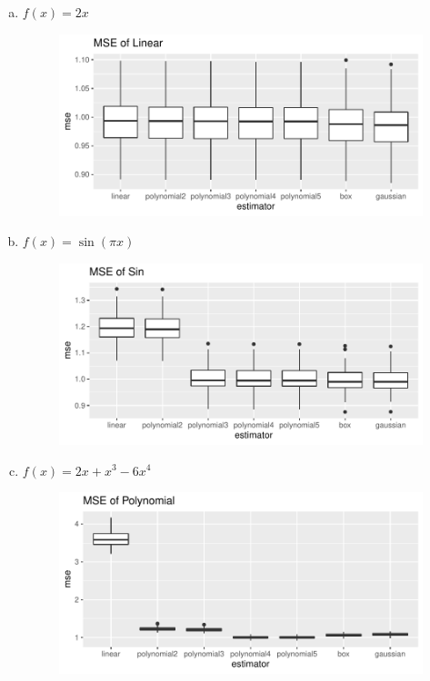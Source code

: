 \documentclass[letterpaper]{article}
\begin{document}
\begin{enumerate}[(a)]
\item $f(x) = 2x$
  \begin{figure}[h]
    \centering
    \includegraphics{mse_linear.pdf}
  \end{figure}
\item $f(x) = \sin(\pi x)$
    \begin{figure}[h]
      \centering
      \includegraphics{mse_sin.pdf}
    \end{figure}
    \pagebreak
  \item $f(x) = 2x + x^3 - 6x^4$
    \begin{figure}[h!]
      \centering
      \includegraphics{mse_polynomial.pdf}
    \end{figure}


\end{enumerate}
\end{document}
